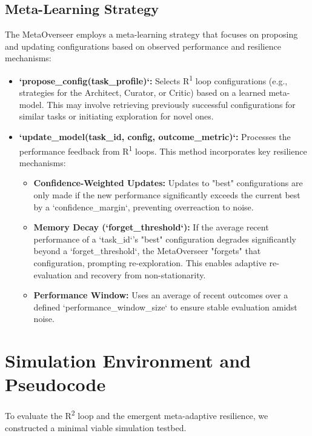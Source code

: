 \documentclass{article}
\begin{document}
\subsection{Meta-Learning Strategy}
The MetaOverseer employs a meta-learning strategy that focuses on proposing and updating configurations based on observed performance and resilience mechanisms:
\begin{itemize}
    \item \textbf{`propose_config(task_profile)`:} Selects R\textsuperscript{1} loop configurations (e.g., strategies for the Architect, Curator, or Critic) based on a learned meta-model. This may involve retrieving previously successful configurations for similar tasks or initiating exploration for novel ones.
    \item \textbf{`update_model(task_id, config, outcome_metric)`:} Processes the performance feedback from R\textsuperscript{1} loops. This method incorporates key resilience mechanisms:
    \begin{itemize}
        \item \textbf{Confidence-Weighted Updates:} Updates to "best" configurations are only made if the new performance significantly exceeds the current best by a `confidence_margin`, preventing overreaction to noise.
        \item \textbf{Memory Decay (`forget_threshold`):} If the average recent performance of a `task_id`'s "best" configuration degrades significantly beyond a `forget_threshold`, the MetaOverseer "forgets" that configuration, prompting re-exploration. This enables adaptive re-evaluation and recovery from non-stationarity.
        \item \textbf{Performance Window:} Uses an average of recent outcomes over a defined `performance_window_size` to ensure stable evaluation amidst noise.
    \end{itemize}
\end{itemize}

\section{Simulation Environment and Pseudocode}
To evaluate the R\textsuperscript{2} loop and the emergent meta-adaptive resilience, we constructed a minimal viable simulation testbed.
\end{document}
